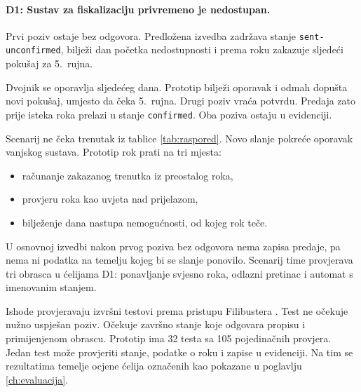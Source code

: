 \paragraph{D1: Sustav za fiskalizaciju privremeno je nedostupan.}
Prvi poziv ostaje bez odgovora. Predložena izvedba zadržava stanje
\texttt{sent-unconfirmed}, bilježi dan početka nedostupnosti i prema roku
zakazuje sljedeći pokušaj za 5.~rujna.

Dvojnik se oporavlja sljedećeg dana. Prototip bilježi oporavak i odmah
dopušta novi pokušaj, umjesto da čeka 5.~rujna. Drugi poziv vraća potvrdu.
Predaja zato prije isteka roka prelazi u stanje \texttt{confirmed}. Oba
poziva ostaju u evidenciji.

Scenarij ne čeka trenutak iz tablice \ref{tab:raspored}. Novo slanje pokreće
oporavak vanjskog sustava. Prototip rok prati na tri mjesta:

\begin{itemize}[nosep, leftmargin=1.4cm]
  \item računanje zakazanog trenutka iz preostalog roka,
  \item provjeru roka kao uvjeta nad prijelazom,
  \item bilježenje dana nastupa nemogućnosti, od kojeg rok teče.
\end{itemize}

U osnovnoj izvedbi nakon prvog poziva bez odgovora nema zapisa predaje, pa
nema ni podatka na temelju kojeg bi se slanje ponovilo. Scenarij time
provjerava tri obrasca u ćelijama D1: ponavljanje svjesno roka, odlazni
pretinac i automat s imenovanim stanjem.


Ishode provjeravaju izvršni testovi prema pristupu Filibustera
\cite{meiklejohn2021filibuster}. Test ne očekuje nužno uspješan poziv.
Očekuje završno stanje koje odgovara propisu i primijenjenom obrascu.
Prototip ima 32 testa sa 105 pojedinačnih provjera. Jedan test može
provjeriti stanje, podatke o roku i zapise u evidenciji. Na tim se
rezultatima temelje ocjene ćelija označenih kao pokazane u poglavlju
\ref{ch:evaluacija}.
